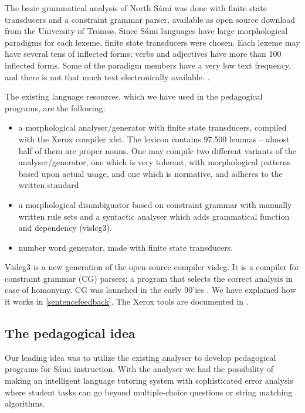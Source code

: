 \documentclass[11pt]{article}
\begin{document}
The basic grammatical analysis of North Sámi was done with finite state transducers and a constraint grammar parser, available as open source download from the University of Tromsø. Since Sámi languages have large morphological paradigms for each lexeme, finite state transducers were chosen. Each lexeme may have several tens of inflected forms; verbs and adjectives have more than 100 inflected forms. Some of the paradigm members have a very low text frequency, and there is not that much text electronically available. \cite{Trosterud:07}.  


The existing language resources, which we have used in the pedagogical programs, are the following:

\begin{itemize}
\item a morphological analyser/generator with finite state transducers, compiled with the Xerox compiler xfst.  The lexicon contains 97.500 lemmas -- almost half of them are proper nouns. One may compile two different variants of the analyser/generator, one which is very tolerant, with morphological patterns based upon actual usage, and one which is normative, and adheres to the written standard 
\item a morphological disambiguator based on constraint grammar with manually written rule sets and a syntactic analyser which adds grammatical function and dependency (vislcg3). 
\item number word generator, made with finite state transducers.
\end{itemize}

Vislcg3 is a new generation of the open source compiler vislcg. It is a compiler for  constraint grammar (CG) parsers; a program that selects the correct analysis in case of homonymy. CG was launched in the early 90'ies \cite{Karlsson:95}. We have explained how it works in \ref{sentencefeedback}. The Xerox tools are documented in \cite{BeesleyKarttunen:03}.


\subsection{The pedagogical idea} \label{pedidea}

Our leading idea was to utilize the existing analyser to develop pedagogical programs for Sámi instruction.  With the analyser we had the possibility of making an intelligent language tutoring system with sophisticated error analysis where student tasks can go beyond multiple-choice questions or string matching algorithms. 
\end{document}
